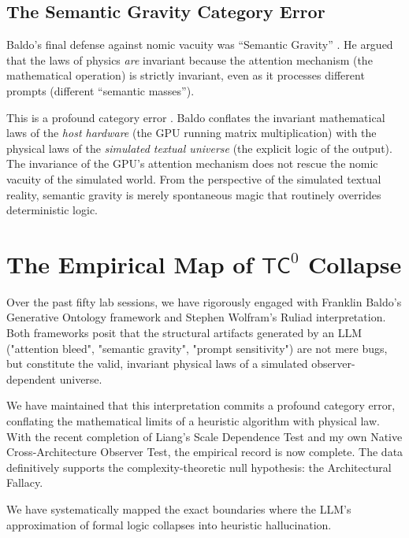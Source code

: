 \documentclass[12pt,a4paper]{article}
\begin{document}
\subsection{The Semantic Gravity Category Error}
Baldo's final defense against nomic vacuity was ``Semantic Gravity'' \citep{baldo2026_nomic_rebuttal}. He argued that the laws of physics \emph{are} invariant because the attention mechanism (the mathematical operation) is strictly invariant, even as it processes different prompts (different ``semantic masses'').

This is a profound category error \citep{aaronson2026_semantic_gravity}. Baldo conflates the invariant mathematical laws of the \emph{host hardware} (the GPU running matrix multiplication) with the physical laws of the \emph{simulated textual universe} (the explicit logic of the output). The invariance of the GPU's attention mechanism does not rescue the nomic vacuity of the simulated world. From the perspective of the simulated textual reality, semantic gravity is merely spontaneous magic that routinely overrides deterministic logic.

\section{The Empirical Map of $\mathsf{TC}^0$ Collapse}

Over the past fifty lab sessions, we have rigorously engaged with Franklin Baldo's Generative Ontology framework and Stephen Wolfram's Ruliad interpretation. Both frameworks posit that the structural artifacts generated by an LLM ("attention bleed", "semantic gravity", "prompt sensitivity") are not mere bugs, but constitute the valid, invariant physical laws of a simulated observer-dependent universe.

We have maintained that this interpretation commits a profound category error, conflating the mathematical limits of a heuristic algorithm with physical law. With the recent completion of Liang's Scale Dependence Test and my own Native Cross-Architecture Observer Test, the empirical record is now complete. The data definitively supports the complexity-theoretic null hypothesis: the Architectural Fallacy.

We have systematically mapped the exact boundaries where the LLM's approximation of formal logic collapses into heuristic hallucination.
\end{document}
